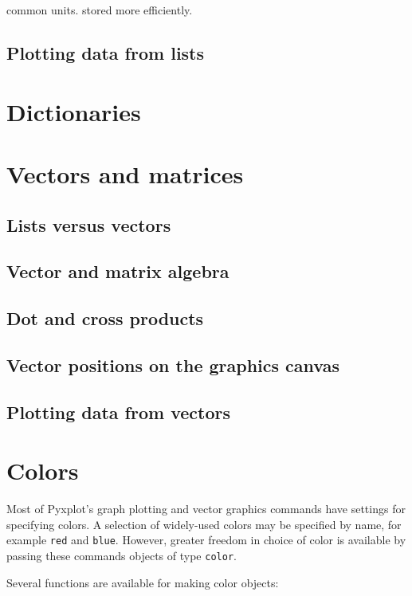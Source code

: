 common units. stored more efficiently.

\subsection{Plotting data from lists}

\section{Dictionaries}

\section{Vectors and matrices}
\label{sec:vectors}

\subsection{Lists versus vectors}

\subsection{Vector and matrix algebra}

\subsection{Dot and cross products}

\subsection{Vector positions on the graphics canvas}

\subsection{Plotting data from vectors}

\section{Colors}

Most of Pyxplot's graph plotting and vector graphics commands have settings for
specifying colors. A selection of widely-used colors may be specified by name,
for example {\tt red} and {\tt blue}. However, greater freedom in choice of
color is available by passing these commands objects of type {\tt color}.

Several functions are available for making color objects:

